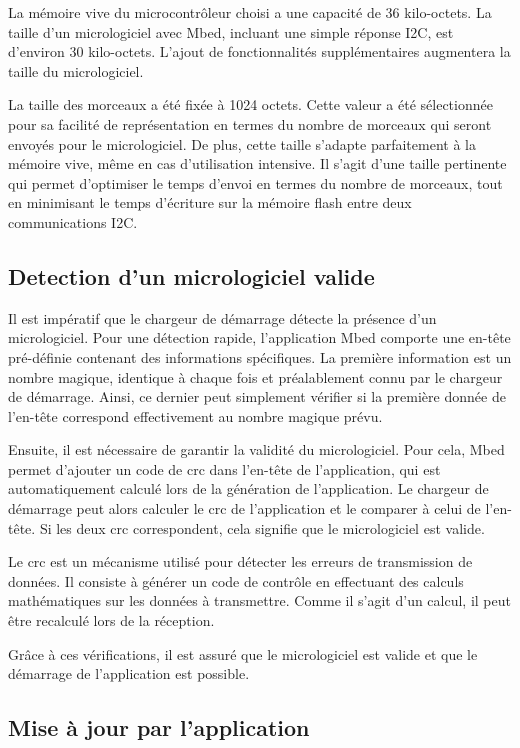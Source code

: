 La mémoire vive du microcontrôleur choisi a une capacité de 36 kilo-octets.
La taille d'un micrologiciel avec Mbed, incluant une simple réponse I2C, est d'environ 30 kilo-octets.
L'ajout de fonctionnalités supplémentaires augmentera la taille du micrologiciel.

La taille des morceaux a été fixée à 1024 octets. Cette valeur a été sélectionnée pour sa facilité de représentation en termes du nombre de morceaux qui seront envoyés pour le micrologiciel.
De plus, cette taille s'adapte parfaitement à la mémoire vive, même en cas d'utilisation intensive.
Il s'agit d'une taille pertinente qui permet d'optimiser le temps d'envoi en termes du nombre de morceaux, tout en minimisant le temps d'écriture sur la mémoire flash entre deux communications I2C.

\subsection{Detection d'un micrologiciel valide}

Il est impératif que le chargeur de démarrage détecte la présence d'un micrologiciel.
Pour une détection rapide, l'application Mbed comporte une en-tête pré-définie contenant des informations spécifiques.
La première information est un nombre magique, identique à chaque fois et préalablement connu par le chargeur de démarrage.
Ainsi, ce dernier peut simplement vérifier si la première donnée de l'en-tête correspond effectivement au nombre magique prévu.

Ensuite, il est nécessaire de garantir la validité du micrologiciel.
Pour cela, Mbed permet d'ajouter un code de \gls{crc} dans l'en-tête de l'application, qui est automatiquement calculé lors de la génération de l'application.
Le chargeur de démarrage peut alors calculer le \gls{crc} de l'application et le comparer à celui de l'en-tête.
Si les deux \gls{crc} correspondent, cela signifie que le micrologiciel est valide.

Le \gls{crc} est un mécanisme utilisé pour détecter les erreurs de transmission de données.
Il consiste à générer un code de contrôle en effectuant des calculs mathématiques sur les données à transmettre.
Comme il s'agit d'un calcul, il peut être recalculé lors de la réception.

Grâce à ces vérifications, il est assuré que le micrologiciel est valide et que le démarrage de l'application est possible.

\subsection{Mise à jour par l'application}

